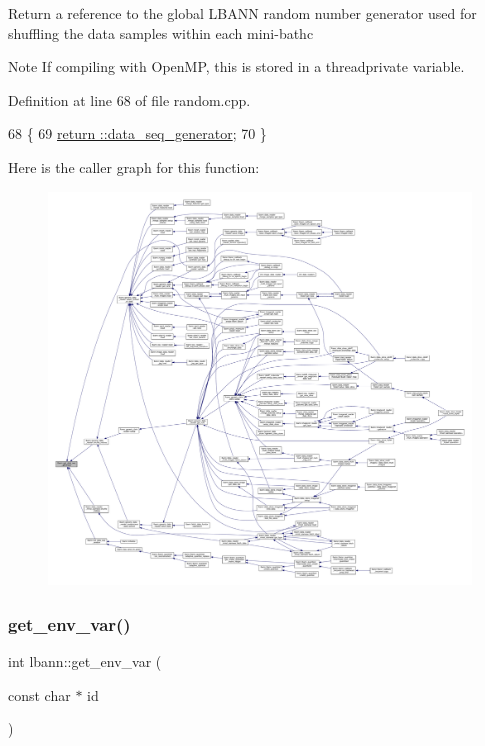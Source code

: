 Return a reference to the global L\+B\+A\+NN random number generator used for shuffling the data samples within each mini-\/bathc \begin{DoxyNote}{Note}
If compiling with Open\+MP, this is stored in a threadprivate variable. 
\end{DoxyNote}


Definition at line 68 of file random.\+cpp.


\begin{DoxyCode}
68                                   \{
69   \hyperlink{namespaceanonymous__namespace_02random_8cpp_03_ac1d3d0259f3e9c9b75e9701ae727d16e}{return ::data\_seq\_generator};
70 \}
\end{DoxyCode}
Here is the caller graph for this function\+:\nopagebreak
\begin{figure}[H]
\begin{center}
\leavevmode
\includegraphics[width=350pt]{namespacelbann_aba9d11cb3a739cd84e7234ceeb32d098_icgraph}
\end{center}
\end{figure}
\mbox{\label{namespacelbann_aa4ee6571e54db5cee7f263029147e5f2}} 
\subsubsection{\texorpdfstring{get\+\_\+env\+\_\+var()}{get\_env\_var()}}
{\footnotesize\ttfamily int lbann\+::get\+\_\+env\+\_\+var (\begin{DoxyParamCaption}\item[{const char $\ast$}]{id }\end{DoxyParamCaption})}

